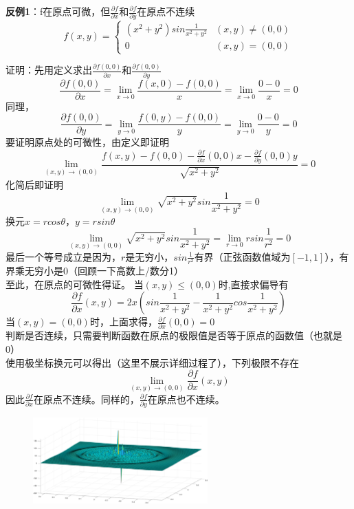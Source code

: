 \documentclass{article}
\begin{document}
\textbf{反例1}：f在原点可微，但$\frac{\partial f}{\partial x} $和$\frac{\partial f}{\partial y} $在原点不连续
\[f(x,y)= \begin{cases} (x^2+y^2)sin \frac{1}{x^2+y^2}   & (x,y) \neq (0,0)\\0 & (x,y) = (0,0)\end{cases}\]

证明：先用定义求出$\frac{\partial f(0,0)}{\partial x}$和$\frac{\partial f(0,0)}{\partial y}$
\[\frac{\partial f(0,0)}{\partial x}=  \lim\limits_{x \rightarrow 0} \frac{f(x,0)-f(0,0)}{x}=\lim\limits_{x \rightarrow 0} \frac{0-0}{x}=0\]
同理，
\[\frac{\partial f(0,0)}{\partial y}=  \lim\limits_{y \rightarrow 0} \frac{f(0,y)-f(0,0)}{y}=\lim\limits_{y \rightarrow 0} \frac{0-0}{y}=0\]
要证明原点处的可微性，由定义即证明
\[\lim\limits_{(x,y) \rightarrow (0,0)} \frac{ f(x,y)-f(0,0) - \frac{\partial f}{\partial x}(0,0) x - \frac{\partial f}{\partial y}(0,0) y}{ \sqrt{x^2 + y^2} } = 0\]
化简后即证明
\[\lim\limits_{(x,y) \rightarrow (0,0)} \sqrt{x^2 + y^2}sin \frac{1}{x^2+y^2} = 0\]
换元$x=rcos\theta$，$y=rsin\theta$
\[\lim\limits_{(x,y) \rightarrow (0,0)} \sqrt{x^2 + y^2}sin \frac{1}{x^2+y^2}
=\lim\limits_{r \rightarrow 0} rsin\frac{1}{r^2} = 0\]
最后一个等号成立是因为，$r$是无穷小，$sin\frac{1}{r^2}$有界（正弦函数值域为$\left[-1,1\right]$），有界乘无穷小是0（回顾一下高数上/数分1）\\
至此，在原点的可微性得证。
当$(x,y) \leq (0,0)$时,直接求偏导有
\[\frac{\partial f}{\partial x}(x,y)=2x\left(sin \frac{1}{x^2+y^2} - \frac{1}{x^2+y^2}cos\frac{1}{x^2+y^2}\right) \]
当$(x,y) = (0,0)$时，上面求得，$\frac{\partial f}{\partial x}(0,0)=0$\\
判断是否连续，只需要判断函数在原点的极限值是否等于原点的函数值（也就是0）\\
使用极坐标换元可以得出（这里不展示详细过程了），下列极限不存在
\[\lim\limits_{(x,y) \rightarrow (0,0)} \frac{\partial f}{\partial x}(x,y) \]
因此$\frac{\partial f}{\partial x}$在原点不连续。同样的，$\frac{\partial f}{\partial y}$在原点也不连续。

\begin{figure}[!h]
    \centering
    \includegraphics[width=0.6\textwidth]{pic/02.png}
    \caption{}
\end{figure}
\end{document}

